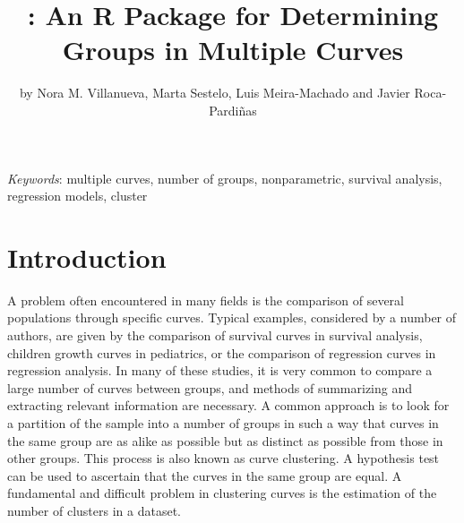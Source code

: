 %

\title{: An R Package for Determining Groups in Multiple Curves }
\author{by Nora M. Villanueva, Marta Sestelo, Luis Meira-Machado and Javier Roca-Pardi\~nas} 

\maketitle


\noindent \textit{Keywords}: multiple curves, number of groups, nonparametric, survival analysis, regression models, cluster


\section{Introduction}
\label{intro}

A problem often encountered in many fields is the comparison of several populations through specific curves. Typical examples, considered by a number of authors, are given by the comparison of survival curves in survival analysis, children growth curves in pediatrics, or the comparison of regression curves in regression analysis.  In many of these studies, it is very common to compare a large number of curves between groups, and methods of summarizing and extracting relevant information are necessary. A common approach is to look for a partition of the sample into a number of groups in such a way that curves in the same group are as alike as possible but as distinct as possible from those in other groups. This process is also known as curve clustering. A hypothesis test can be used to ascertain that the curves in the same group are equal. A fundamental and difficult problem in clustering curves is the estimation of the number of clusters in a dataset.


